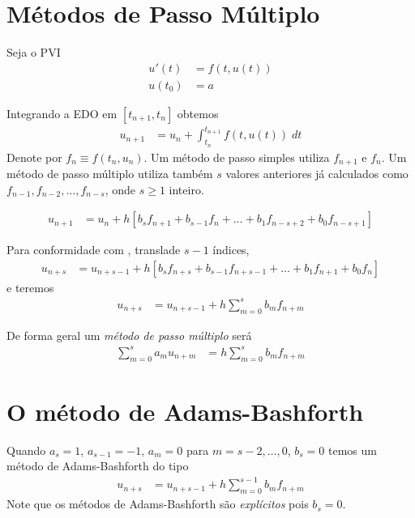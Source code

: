 \section{Métodos de Passo Múltiplo}
Seja o PVI
\begin{eqnarray}
  u'(t) &= f(t,u(t)) \\
  u(t_0) &= a
\end{eqnarray}


Integrando a EDO em $[t_{n+1},t_{n}]$ obtemos
\begin{eqnarray}
  u_{n+1}  &= u_n  + \int _{t_n}^{t_{n+1}} f(t,u(t)) \; dt
\end{eqnarray}
Denote por $f_n\equiv f(t_n,u_n)$. Um método de passo simples utiliza $f_{n+1}$ e $f_{n}$. Um método de passo múltiplo utiliza também $s$ valores anteriores já calculados como $f_{n-1},f_{n-2},\ldots ,f_{n-s}$, onde $s\geq 1$ inteiro.

\begin{eqnarray}
  u_{n+1}  &= u_{n}  + h[b_s f_{n+1}+b_{s-1}f_{n}+\ldots +b_1f_{n-s+2}+b_0f_{n-s+1}]
\end{eqnarray}

Para conformidade com \cite{iserles2009first}, translade $s-1$ índices,
\begin{eqnarray}
  u_{n+s}  &= u_{n+s-1}  + h[b_s f_{n+s}+b_{s-1}f_{n+s-1}+\ldots +b_1f_{n+1}+b_0f_n] \label{multiad}
\end{eqnarray}
e teremos
\begin{eqnarray}
  u_{n+s}  &= u_{n+s-1}  + h \sum_{m=0}^s b_m f_{n+m}
\end{eqnarray}

De forma geral um \emph{método de passo múltiplo} será
\begin{eqnarray}
  \sum_{m=0}^s a_m u_{n+m}  &=  h \sum_{m=0}^s b_m f_{n+m}
\end{eqnarray}


\section{O método de Adams-Bashforth}
Quando $a_s=1$, $a_{s-1}=-1$, $a_m=0$ para $m=s-2,\ldots ,0$, $b_s=0$ temos um método de Adams-Bashforth do tipo
\begin{eqnarray}\label{AB}
  u_{n+s}  &= u_{n+s-1}  + h \sum_{m=0}^{s-1} b_m f_{n+m}
\end{eqnarray}
Note que os métodos de Adams-Bashforth são \emph{explícitos} pois $b_s=0$.



